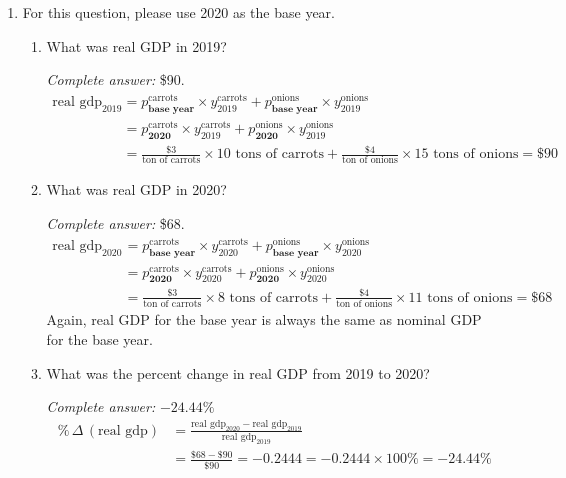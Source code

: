 \documentclass{assignment}
\begin{document}
\begin{enumerate}
\begin{enumerate}
\end{enumerate}

\item For this question, please use 2020 as the base year.

\begin{enumerate}

\item What was real GDP in 2019?

\begin{solution}
\emph{Complete answer:} \$90.
\begin{align*}
\text{real gdp}_{\text{2019}} &= 
p^{\text{carrots}}_{\textbf{base year}} \times y^{\text{carrots}}_{\text{2019}} +
p^{\text{onions}}_{\textbf{base year}} \times y^{\text{onions}}_{\text{2019}} \\
 &= 
p^{\text{carrots}}_{\textbf{2020}} \times y^{\text{carrots}}_{\text{2019}} +
p^{\text{onions}}_{\textbf{2020}} \times y^{\text{onions}}_{\text{2019}} \\
 &= \frac{\$3}{\text{ton of carrots}} \times 10 \text{ tons of carrots} + \frac{\$4}{\text{ton of onions}} \times 15 \text{ tons of onions} = \$90
\end{align*}
\end{solution}

\item What was real GDP in 2020?

\begin{solution}
\emph{Complete answer:} \$68.
\begin{align*}
\text{real gdp}_{\text{2020}} &= 
p^{\text{carrots}}_{\textbf{base year}} \times y^{\text{carrots}}_{\text{2020}} +
p^{\text{onions}}_{\textbf{base year}} \times y^{\text{onions}}_{\text{2020}} \\
 &= 
p^{\text{carrots}}_{\textbf{2020}} \times y^{\text{carrots}}_{\text{2020}} +
p^{\text{onions}}_{\textbf{2020}} \times y^{\text{onions}}_{\text{2020}} \\
 &= \frac{\$3}{\text{ton of carrots}} \times 8 \text{ tons of carrots} + \frac{\$4}{\text{ton of onions}} \times 11 \text{ tons of onions} = \$68
\end{align*}
Again, real GDP for the base year is always the same as nominal GDP for the base year.
\end{solution}

\item What was the percent change in real GDP from 2019 to 2020?

\begin{solution}
\emph{Complete answer:} $-24.44\%$
\begin{align*}
\%\,\Delta\,(\text{real gdp}) &= \frac{\text{real gdp}_{\text{2020}} - \text{real gdp}_{\text{2019}}}{\text{real gdp}_{\text{2019}}} \\
&= \frac{\$68 - \$90}{\$90} = -0.2444 = -0.2444 \times 100\% = -24.44\%
\end{align*}
\end{solution}


\end{enumerate}
\end{enumerate}
\end{document}
